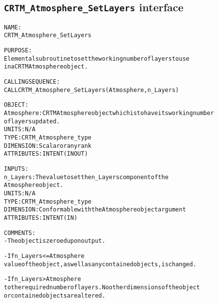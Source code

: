 \subsection{\texttt{CRTM\_Atmosphere\_SetLayers} interface}
  \label{sec:CRTM_Atmosphere_SetLayers_interface}
  \begin{alltt}
 
  NAME:
        CRTM_Atmosphere_SetLayers
 
  PURPOSE:
        Elemental subroutine to set the working number of layers to use
        in a CRTM Atmosphere object.
 
  CALLING SEQUENCE:
       CALL CRTM_Atmosphere_SetLayers( Atmosphere, n_Layers )
 
  OBJECT:
        Atmosphere:   CRTM Atmosphere object which is to have its working number
                      of layers updated.
                      UNITS:      N/A
                      TYPE:       CRTM_Atmosphere_type
                      DIMENSION:  Scalar or any rank
                      ATTRIBUTES: INTENT(IN OUT)
 
  INPUTS:
        n_Layers:     The value to set the n_Layers component of the
                      Atmosphere object.
                      UNITS:      N/A
                      TYPE:       CRTM_Atmosphere_type
                      DIMENSION:  Conformable with the Atmosphere object argument
                      ATTRIBUTES: INTENT(IN)
 
  COMMENTS:
        - The object is zeroed upon output.
 
        - If n_Layers <= Atmosphere%Max_Layers, then only the n_Layers dimension
          value of the object, as well as any contained objects, is changed.
 
        - If n_Layers > Atmosphere%Max_Layers, then the object is reallocated
          to the required number of layers. No other dimensions of the object
          or contained objects are altered.
 
  \end{alltt}
